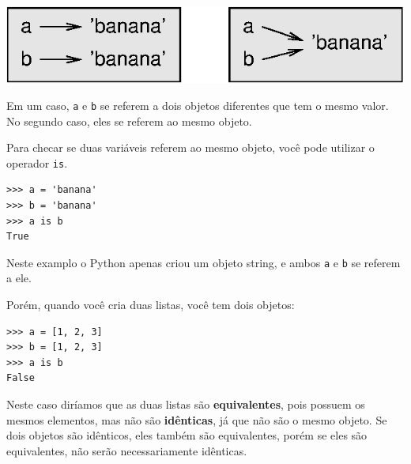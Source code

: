 
\beforefig
\centerline{\includegraphics{figs2/list1.eps}}
\afterfig

Em um caso, {\tt a} e {\tt b} se referem a dois objetos diferentes
que tem o mesmo valor. No segundo caso, eles se referem ao mesmo objeto.



Para checar se duas variáveis referem ao mesmo objeto, você pode
utilizar o operador {\tt is}.


\beforeverb
\begin{verbatim}
>>> a = 'banana'
>>> b = 'banana'
>>> a is b
True
\end{verbatim}
\afterverb
%
Neste examplo o Python apenas criou um objeto string,
e ambos {\tt a} e {\tt b} se referem a ele.


Porém, quando você cria duas listas, você tem dois objetos:


\beforeverb
\begin{verbatim}
>>> a = [1, 2, 3]
>>> b = [1, 2, 3]
>>> a is b
False
\end{verbatim}
\afterverb
%

Neste caso diríamos que as duas listas são {\bf equivalentes},
pois possuem os mesmos elementos, mas não são {\bf idênticas}, já
que não são o mesmo objeto. Se dois objetos são idênticos, eles também
são equivalentes, porém se eles são equivalentes, não serão necessariamente
idênticas.


